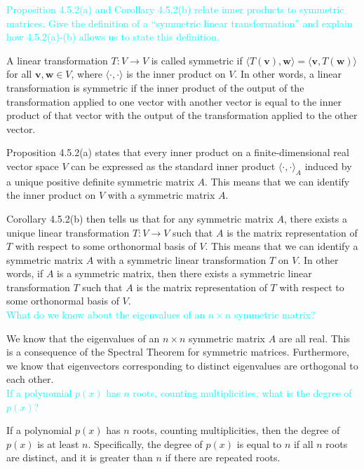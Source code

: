 \documentclass[fontsize=12pt]{scrartcl}
\begin{document}
\noindent
\textcolor{cyan}{Proposition 4.5.2(a) and Corollary 4.5.2(b) relate inner products to symmetric matrices. Give the definition of a ``symmetric linear transformation'' and explain how 4.5.2(a)-(b) allows us to state this definition.}

\noindent
A linear transformation $T: V \to V$ is called symmetric if $\langle T(\mathbf{v}), \mathbf{w} \rangle = \langle \mathbf{v}, T(\mathbf{w}) \rangle$ for all $\mathbf{v}, \mathbf{w} \in V$, where $\langle \cdot, \cdot \rangle$ is the inner product on $V$. In other words, a linear transformation is symmetric if the inner product of the output of the transformation applied to one vector with another vector is equal to the inner product of that vector with the output of the transformation applied to the other vector.

\noindent
Proposition 4.5.2(a) states that every inner product on a finite-dimensional real vector space $V$ can be expressed as the standard inner product $\langle \cdot, \cdot \rangle_A$ induced by a unique positive definite symmetric matrix $A$. This means that we can identify the inner product on $V$ with a symmetric matrix $A$.

\noindent
Corollary 4.5.2(b) then tells us that for any symmetric matrix $A$, there exists a unique linear transformation $T: V \to V$ such that $A$ is the matrix representation of $T$ with respect to some orthonormal basis of $V$. This means that we can identify a symmetric matrix $A$ with a symmetric linear transformation $T$ on $V$. In other words, if $A$ is a symmetric matrix, then there exists a symmetric linear transformation $T$ such that $A$ is the matrix representation of $T$ with respect to some orthonormal basis of $V$.
\\

\noindent
\textcolor{cyan}{What do we know about the eigenvalues of an $n \times n$ symmetric matrix?}

\noindent
We know that the eigenvalues of an $n \times n$ symmetric matrix $A$ are all real. This is a consequence of the Spectral Theorem for symmetric matrices. Furthermore, we know that eigenvectors corresponding to distinct eigenvalues are orthogonal to each other.
\\

\noindent
\textcolor{cyan}{If a polynomial $p(x)$ has $n$ roots, counting multiplicities, what is the degree of $p(x)$?}

\noindent
If a polynomial $p(x)$ has $n$ roots, counting multiplicities, then the degree of $p(x)$ is at least $n$. Specifically, the degree of $p(x)$ is equal to $n$ if all $n$ roots are distinct, and it is greater than $n$ if there are repeated roots.
\\
\end{document}
